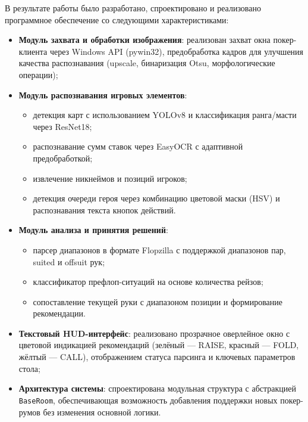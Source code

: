 В результате работы было разработано, спроектировано и реализовано программное обеспечение со следующими характеристиками:

\begin{itemize}
    \item \textbf{Модуль захвата и обработки изображения}: реализован захват окна покер-клиента через Windows API (pywin32), предобработка кадров для улучшения качества распознавания (upscale, бинаризация Otsu, морфологические операции);
    
    \item \textbf{Модуль распознавания игровых элементов}: 
    \begin{itemize}
        \item детекция карт с использованием YOLOv8 и классификация ранга/масти через ResNet18;
        \item распознавание сумм ставок через EasyOCR с адаптивной предобработкой;
        \item извлечение никнеймов и позиций игроков;
        \item детекция очереди героя через комбинацию цветовой маски (HSV) и распознавания текста кнопок действий.
    \end{itemize}
    
    \item \textbf{Модуль анализа и принятия решений}: 
    \begin{itemize}
        \item парсер диапазонов в формате Flopzilla с поддержкой диапазонов пар, suited и offsuit рук;
        \item классификатор префлоп-ситуаций на основе количества рейзов;
        \item сопоставление текущей руки с диапазоном позиции и формирование рекомендации.
    \end{itemize}
    
    \item \textbf{Текстовый HUD-интерфейс}: реализовано прозрачное оверлейное окно с цветовой индикацией рекомендаций (зелёный --- RAISE, красный --- FOLD, жёлтый --- CALL), отображением статуса парсинга и ключевых параметров стола;
    
    \item \textbf{Архитектура системы}: спроектирована модульная структура с абстракцией \texttt{BaseRoom}, обеспечивающая возможность добавления поддержки новых покер-румов без изменения основной логики.
\end{itemize}

